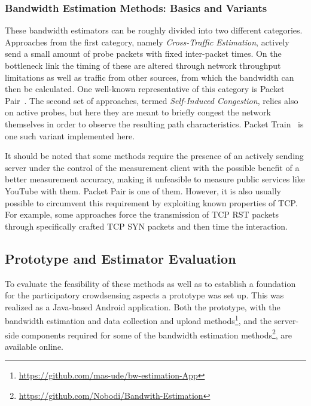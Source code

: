 \subsubsection{Bandwidth Estimation Methods: Basics and Variants}

These bandwidth estimators can be roughly divided into two different categories. Approaches from the first category, namely \textit{Cross-Traffic Estimation}, actively send a small amount of probe packets with fixed inter-packet times. On the bottleneck link the timing of these are altered through network throughput limitations as well as traffic from other sources, from which the bandwidth can then be calculated. One well-known representative of this category is Packet Pair~\cite{Bolot:1993:EPD:167954.166265,749288}. The second set of approaches, termed \textit{Self-Induced Congestion}, relies also on active probes, but here they are meant to briefly congest the network themselves in order to observe the resulting path characteristics. Packet Train~\cite{Jain02pathload:a} is one such variant implemented here.

It should be noted that some methods require the presence of an actively sending server under the control of the measurement client with the possible benefit of a better measurement accuracy, making it unfeasible to measure public services like YouTube with them. Packet Pair is one of them. However, it is also usually possible to circumvent this requirement by exploiting known properties of \acrshort{TCP}. For example, some approaches \cite{saroiu2002sprobe,Chakravarty08linkwidth:a} force the transmission of \gls{TCP} RST packets through specifically crafted \gls{TCP} SYN packets and then time the interaction.


\subsection{Prototype and Estimator Evaluation}

To evaluate the feasibility of these methods as well as to establish a foundation for the participatory crowdsensing aspects a prototype was set up. This was realized as a Java-based Android application. 
Both the prototype, with the bandwidth estimation and data collection and upload methods\footnote{\url{https://github.com/mas-ude/bw-estimation-App}}, and the  server-side components required for some of the bandwidth estimation methods\footnote{\url{https://github.com/Nobodi/Bandwith-Estimation}}, are available online.


